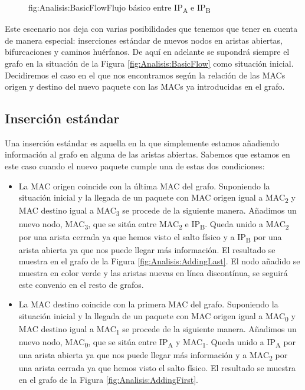 \documentclass[tfg,epsbased,lof,lot,loa,final,nocopyright,overleaf]{tfgtfmthesisuam}
\begin{document}
\begin{figure}[Flujo básico entre dos IPs]{fig:Analisis:BasicFlow}{Flujo básico entre IP\textsubscript{A} e IP\textsubscript{B}}
    
\end{figure}

Este escenario nos deja con varias posibilidades que tenemos que tener en cuenta de manera especial: inserciones estándar de nuevos nodos en aristas abiertas, bifurcaciones y caminos huérfanos. De aquí en adelante se supondrá siempre el grafo en la situación de la Figura \ref{fig:Analisis:BasicFlow} como situación inicial. Decidiremos el caso en el que nos encontramos según la relación de las MACs origen y destino del nuevo paquete con las MACs ya introducidas en el grafo.

\subsection{Inserción estándar}
Una inserción estándar es aquella en la que simplemente estamos añadiendo información al grafo en alguna de las aristas abiertas. Sabemos que estamos en este caso cuando el nuevo paquete cumple una de estas dos condiciones:
\begin{itemize}
    \item La MAC origen coincide con la última MAC del grafo. Suponiendo la situación inicial y la llegada de un paquete con MAC origen igual a MAC\textsubscript{2} y MAC destino igual a MAC\textsubscript{3} se procede de la siguiente manera. Añadimos un nuevo nodo, MAC\textsubscript{3}, que se sitúa entre MAC\textsubscript{2} e IP\textsubscript{B}. Queda unido a  MAC\textsubscript{2} por una arista cerrada ya que hemos visto el salto físico y a IP\textsubscript{B} por una arista abierta ya que nos puede llegar más información. El resultado se muestra en el grafo de la Figura \ref{fig:Analisis:AddingLast}. El nodo añadido se muestra en color verde y las aristas nuevas en línea discontínua, se seguirá este convenio en el resto de grafos.
    \item La MAC destino coincide con la primera MAC del grafo. Suponiendo la situación inicial y la llegada de un paquete con MAC origen igual a MAC\textsubscript{0} y MAC destino igual a MAC\textsubscript{1} se procede de la siguiente manera. Añadimos un nuevo nodo, MAC\textsubscript{0}, que se sitúa entre IP\textsubscript{A} y MAC\textsubscript{1}. Queda unido a IP\textsubscript{A} por una arista abierta ya que nos puede llegar más información y a  MAC\textsubscript{2} por una arista cerrada ya que hemos visto el salto físico. El resultado se muestra en el grafo de la Figura \ref{fig:Analisis:AddingFirst}.
\end{itemize}
\end{document}
